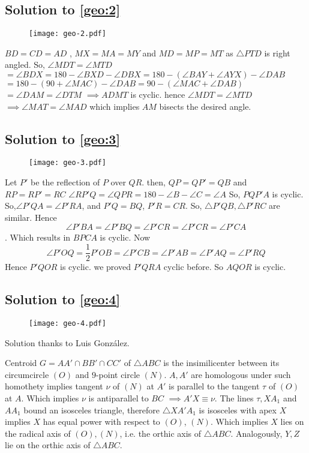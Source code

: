 \subsection*{Solution to \autoref{geo:2}}

\begin{figure}[ht]
\centering
	\texttt{[image: geo-2.pdf]}
\end{figure}

$BD=CD=AD$ ,
$MX=MA=MY$ and
$MD=MP=MT$ 
as $\triangle PTD$ is right angled.
So, $\angle MDT=\angle MTD$
$= \angle BDX = 180 -\angle BXD - \angle DBX =180 - (\angle BAY +\angle AYX ) - \angle DAB $
$=180 -(90+\angle MAC)- \angle DAB =90 -(\angle MAC + \angle DAB)$
 $\boxed{= \angle DAM =\angle DTM} $
$\implies ADMT $ is cyclic. hence $\angle MDT =\angle MTD $
$\implies \angle MAT =\angle MAD$ which implies $AM$ bisects the desired angle. 

\subsection*{Solution to \autoref{geo:3}}
\begin{figure}[ht]
\centering
	\texttt{[image: geo-3.pdf]}
\end{figure}

Let $P'$ be the reflection of $P$ over $QR$.
then, $QP=QP'=QB$ and 
$RP=RP'=RC$
$\angle RP'Q=\angle QPR=180 -\angle B -\angle C=\angle A$
So, $PQP'A$ is cyclic.
So,$\angle P'QA=\angle P'RA$, and $P'Q=BQ$, $P'R=CR$.
So, $\triangle P'QB,  \triangle P'RC$ are similar.
Hence $$\angle P'BA= \angle P'BQ=\angle P'CR=\angle P'CR=\angle P'CA$$.
Which results in $BPCA$ is cyclic.
Now $$\angle P'OQ=\frac{1}{2} P'OB=\angle P'CB=\angle P'AB=\angle P'AQ=\angle P'RQ$$
Hence $P'QOR$ is cyclic. we proved $P'QRA$ cyclic before. 
So $AQOR$ is cyclic.


\subsection*{Solution to \autoref{geo:4}}
\begin{figure}[htb]
\centering
	\texttt{[image: geo-4.pdf]}
\end{figure}
Solution thanks to Luis Gonz\'{a}lez.

Centroid $G = AA' \cap BB' \cap CC'$ of $\triangle ABC$ is the insimilicenter between its circumcircle $(O)$ and $9$-point circle $(N)$. $A, A'$ are homologous under such homothety implies tangent $\nu$ of $(N)$ at $A'$ is parallel to the tangent $\tau$ of $(O)$ at $A$. Which implies $\nu$ is antiparallel to $BC$ $\implies  A'X \equiv \nu$. The lines $\tau, XA_1$ and $AA_1$ bound an isosceles triangle, therefore $\triangle XA'A_1$ is isosceles with apex $X$ implies $X$ has equal power with respect to $(O)$, $(N)$. Which implies $X$ lies on the radical axis of $(O), (N)$, i.e. the orthic axis of $\triangle ABC$. Analogously, $Y, Z$ lie on the orthic axis of $\triangle ABC$.


